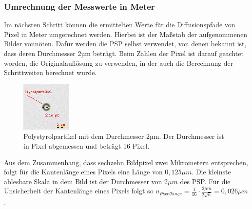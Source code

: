 \documentclass[
  9pt,
]{article}
\begin{document}
\hypertarget{umrechnung-der-messwerte-in-meter}{%
\subsubsection{Umrechnung der Messwerte in
Meter}\label{umrechnung-der-messwerte-in-meter}}

Im nächsten Schritt können die ermittelten Werte für die Diffusionspfade
von Pixel in Meter umgerechnet werden. Hierbei ist der Maßstab der
aufgenommenen Bilder vonnöten. Dafür werden die PSP selbst verwendet,
von denen bekannt ist, dass deren Durchmesser 2µm beträgt. Beim Zählen
der Pixel ist darauf geachtet worden, die Originalauflösung zu
verwenden, in der auch die Berechnung der Schrittweiten berechnet wurde.

\begin{figure}
\centering
\includegraphics[width=\textwidth,height=0.21\textheight]{Bilder/styrolpartikel.png}
\caption{Polystyrolpartikel mit dem Durchmesser 2µm. Der Durchmesser ist
in Pixel abgemessen und beträgt 16 Pixel.}
\end{figure}

Aus dem Zusammenhang, dass sechzehn Bildpixel zwei Mikrometern
entsprechen, folgt für die Kantenlänge eines Pixels eine Länge von
\(0,125 \mu m\). Die kleinste ablesbare Skala in dem Bild ist der
Durchmesser von \(2\mu m\) des PSP. Für die Unsicherheit der Kantenlänge
eines Pixels folgt so
\(u_{Pixellänge} = \frac{1}{16}\cdot \frac{2\mu m}{2\sqrt{6}} = 0,026\mu m\).
\end{document}

